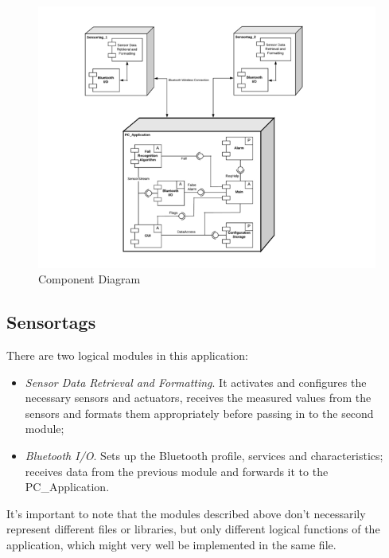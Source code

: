 \documentclass[conference,12pt]{IEEETran}
\begin{document}
\FloatBarrier
\begin{figure}[!h]
	\centering
	\includegraphics[scale=0.65]{images/Comp_Diag.png}
	\caption{Component Diagram}
	\label{img:Comp_Diag}
\end{figure}
\FloatBarrier

\subsection{Sensortags}
There are two logical modules in this application:

\begin{itemize}
	\item \textit{Sensor Data Retrieval and Formatting}. It activates and configures the necessary sensors and actuators, receives the measured values from the sensors and formats them appropriately before passing in to the second module;
	\item \textit{Bluetooth I/O}. Sets up the Bluetooth profile, services and characteristics; receives data from the previous module and forwards it to the PC\_Application.
\end{itemize}
It’s important to note that the modules described above don’t necessarily represent different files or libraries, but only different logical functions of the application, which might very well be implemented in the same file.
\end{document}
